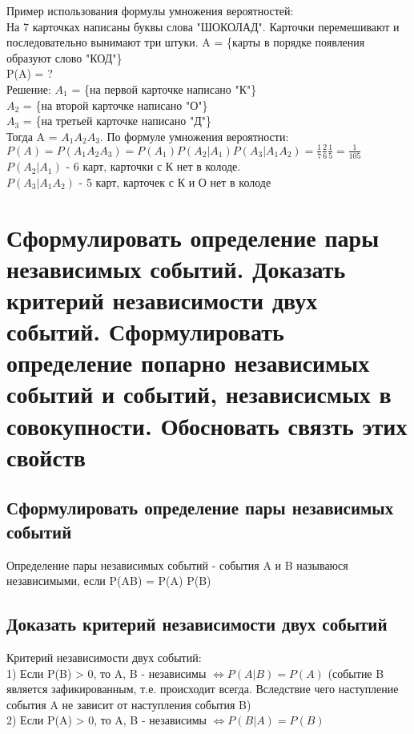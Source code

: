 Пример использования формулы умножения вероятностей:\\
На 7 карточках написаны буквы слова "ШОКОЛАД". Карточки перемешивают и последовательно вынимают три штуки. A = \{карты в порядке появления образуют слово "КОД"\}\\
P(A) = ?\\
Решение:
$A_{1}$ = \{на первой карточке написано "К"\}\\
$A_{2}$ = \{на второй карточке написано "О"\}\\
$A_{3}$ = \{на третьей карточке написано "Д"\}\\
Тогда A = $A_{1} A_{2} A_{3}$. По формуле умножения вероятности:\\
$P(A) = P(A_{1} A_{2} A_{3}) = P(A_{1}) P(A_{2} | A_{1}) P(A_{3} | A_{1} A_{2}) = \frac{1}{7} \frac{2}{6} \frac{1}{5} = \frac{1}{105}$\\
$P(A_{2} | A_{1})$ - 6 карт, карточки с К нет в колоде.\\
$P(A_{3} | A_{1} A_{2})$ - 5 карт, карточек с К и О нет в колоде\\

\section{Сформулировать определение пары независимых событий. Доказать критерий независимости двух событий. Сформулировать определение попарно независимых событий и событий, независисмых в совокупности. Обосновать связть этих свойств}
\subsection{Сформулировать определение пары независимых событий}
Определение пары независимых событий - события A и B называюся независимыми, если P(AB) = P(A) P(B)\\
\subsection{Доказать критерий независимости двух событий}
Критерий независимости двух событий:\\
1) Если P(B) > 0, то A, B - независимы $\Leftrightarrow P(A|B) = P(A)$ (событие B является зафикированным, т.е. происходит всегда. Вследствие чего наступление события A не зависит от наступления события B)\\
2) Если P(A) > 0, то A, B - независимы $\Leftrightarrow P(B|A) = P(B)$\\


